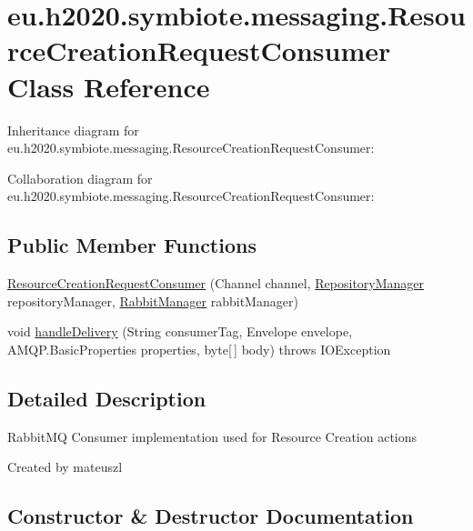 \hypertarget{classeu_1_1h2020_1_1symbiote_1_1messaging_1_1ResourceCreationRequestConsumer}{}\section{eu.\+h2020.\+symbiote.\+messaging.\+Resource\+Creation\+Request\+Consumer Class Reference}
\label{classeu_1_1h2020_1_1symbiote_1_1messaging_1_1ResourceCreationRequestConsumer}


Inheritance diagram for eu.\+h2020.\+symbiote.\+messaging.\+Resource\+Creation\+Request\+Consumer\+:


Collaboration diagram for eu.\+h2020.\+symbiote.\+messaging.\+Resource\+Creation\+Request\+Consumer\+:
\subsection*{Public Member Functions}
\begin{DoxyCompactItemize}
\item 
\hyperlink{classeu_1_1h2020_1_1symbiote_1_1messaging_1_1ResourceCreationRequestConsumer_ad02c4274f1fa39b858e7c68120704e94}{Resource\+Creation\+Request\+Consumer} (Channel channel, \hyperlink{classeu_1_1h2020_1_1symbiote_1_1repository_1_1RepositoryManager}{Repository\+Manager} repository\+Manager, \hyperlink{classeu_1_1h2020_1_1symbiote_1_1messaging_1_1RabbitManager}{Rabbit\+Manager} rabbit\+Manager)
\item 
void \hyperlink{classeu_1_1h2020_1_1symbiote_1_1messaging_1_1ResourceCreationRequestConsumer_ac2192f2c6e6d644dc1ba1ca91a2fbb3c}{handle\+Delivery} (String consumer\+Tag, Envelope envelope, A\+M\+Q\+P.\+Basic\+Properties properties, byte\mbox{[}$\,$\mbox{]} body)  throws I\+O\+Exception 
\end{DoxyCompactItemize}


\subsection{Detailed Description}
Rabbit\+MQ Consumer implementation used for Resource Creation actions

Created by mateuszl 

\subsection{Constructor \& Destructor Documentation}
